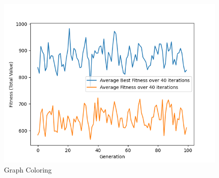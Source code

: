 \documentclass[11pt, letterpaper]{article}
\begin{document}
\begin{figure}[!h]
  \includegraphics[width=\linewidth]{images/knapsack_fp_rd.png}
  \caption{Graph Coloring}
\endminipage
\end{figure}
\end{document}
